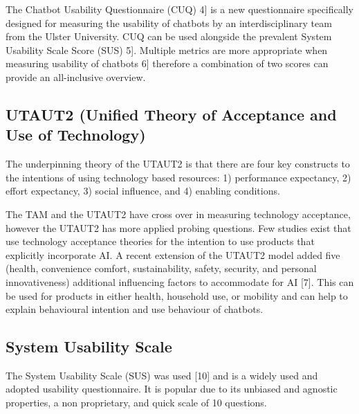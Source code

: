 \documentclass[a4paper, nobind]{templates/ociamthesis}
\begin{document}
The Chatbot Usability Questionnaire (CUQ) \hspace{0pt}{[}4{]}\hspace{0pt} is a new questionnaire specifically designed for measuring the usability of chatbots by an interdisciplinary team from the Ulster University. CUQ can be used alongside the prevalent System Usability Scale Score (SUS) \hspace{0pt}{[}5{]}\hspace{0pt}. Multiple metrics are more appropriate when measuring usability of chatbots \hspace{0pt}{[}6{]}\hspace{0pt} therefore a combination of two scores can provide an all-inclusive overview.

\hypertarget{utaut2-unified-theory-of-acceptance-and-use-of-technology}{%
\subsection{UTAUT2 (Unified Theory of Acceptance and Use of Technology)}\label{utaut2-unified-theory-of-acceptance-and-use-of-technology}}

The underpinning theory of the UTAUT2 is that there are four key constructs to the intentions of using technology based resources: 1) performance expectancy, 2) effort expectancy, 3) social influence, and 4) enabling conditions.

The TAM and the UTAUT2 have cross over in measuring technology acceptance, however the UTAUT2 has more applied probing questions. Few studies exist that use technology acceptance theories for the intention to use products that explicitly incorporate AI. A recent extension of the UTAUT2 model added five (health, convenience comfort, sustainability, safety, security, and personal innovativeness) additional influencing factors to accommodate for AI {[}7{]}. This can be used for products in either health, household use, or mobility and can help to explain behavioural intention and use behaviour of chatbots.

\hypertarget{system-usability-scale}{%
\subsection{System Usability Scale}\label{system-usability-scale}}

The System Usability Scale (SUS) was used {[}10{]} and is a widely used and adopted usability questionnaire.
It is popular due to its unbiased and agnostic properties, a non proprietary, and quick scale of 10 questions.
\end{document}
